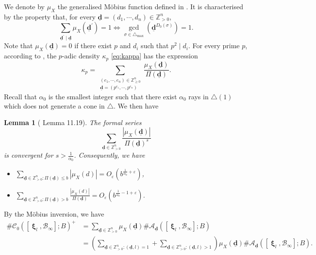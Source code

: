 \documentclass[11pt,letterpaper]{amsart}
\newcommand{\BZ}{{\mathbb {Z}}}
\newcommand{\CA}{{\mathcal {A}}}
\newcommand{\CB}{{\mathcal {B}}}
\newcommand{\CC}{{\mathcal {C}}}
\newcommand{\dd}{\underline{\mathbf{d}}}
\DeclareMathOperator{\bxi}{\mathbf{\xi}}
\theoremstyle{plain}
\numberwithin{equation}{section}
\newtheorem{lemma}[theorem]{Lemma}
\theoremstyle{definition}
\theoremstyle{remark}
\begin{document}
	We denote by $\mu_X$ the generalised Möbius function defined in \cite[p. 234]{Salberger}. It is characterised by the property that, for every $\dd=(d_1,\cdots,d_n)\in\BZ_{>0}^n$,
	$$\sum_{\dd^\prime\mid \dd}\mu_X(\dd^\prime)=1\Longleftrightarrow \gcd_{\sigma\in\triangle_{\max}}(\dd^{D_0(\sigma)})=1.$$
	Note that $\mu_X(\dd)=0$ if there exist $p$  and $d_i$ such that $p^2\mid d_i$.
	For every prime $p$, according to \cite[(11.14)]{Salberger}, the $p$-adic density $\kappa_p$ \eqref{eq:kappa} has the expression
	\begin{equation}\label{eq:kappanuX}
		\kappa_p=\sum_{\substack{(e_1,\cdots,e_n)\in\BZ_{\geqslant 0}^n\\\dd=(p^{e_1},\cdots,p^{e_n})}}\frac{\mu_X(\dd)}{\Pi(\dd)}.
	\end{equation}
	Recall that $\alpha_0$ is the smallest integer such that there exist $\alpha_0$ rays in $\triangle(1)$ which does not generate a cone in $\triangle$. We then have
	\begin{lemma}[\cite{Salberger} Lemma 11.19]\label{le:summud}
		The formal series $$\sum_{\dd\in\BZ_{>0}^n}\frac{|\mu_X(\dd)|}{\Pi(\dd)^s}$$ is convergent for $s>\frac{1}{\alpha_0}$. Consequently, we have
		\begin{itemize}
			\item $\sum_{\dd\in\BZ_{>0}^n:\Pi(\dd)\leqslant b}|\mu_X(d)|=O_\varepsilon(b^{\frac{1}{\alpha_0}+\varepsilon})$,
			\item $\sum_{\dd\in\BZ_{>0}^n:\Pi(\dd)> b}\frac{|\mu_X(d)|}{\Pi(\dd)}=O_\varepsilon(b^{\frac{1}{\alpha_0}-1+\varepsilon})$.
		\end{itemize}
	\end{lemma}
	
	By the Möbius inversion, we have 
	\begin{align*}
		\#\CC_0([\bxi_l,\CB_\infty];B)^+&=\sum_{\dd\in\BZ_{>0}^n}\mu_X(\dd)\#\CA_{\dd}([\bxi_l,\CB_\infty];B)\\ &=\left(\sum_{\dd\in\BZ_{>0}^n:(\dd,l)=1}+\sum_{\dd\in\BZ_{>0}^n:(\dd,l)>1}\right)\mu_X(\dd)\#\CA_{\dd}([\bxi_l,\CB_\infty];B).
	\end{align*} 
	
\end{document}
